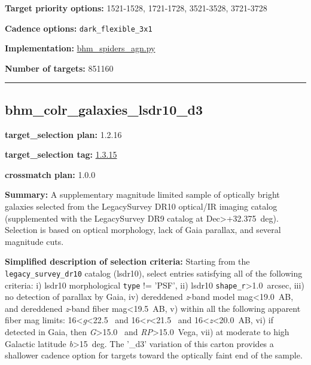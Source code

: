 \noindent\textbf{Target priority options:} 1521-1528, 1721-1728, 3521-3528,
3721-3728

\noindent\textbf{Cadence options:} \texttt{dark\_flexible\_3x1}

\noindent\textbf{Implementation:}
\href{https://github.com/sdss/target_selection/blob/1.3.3/python/target_selection/cartons/bhm_spiders_agn.py}{bhm\_spiders\_agn.py}

\noindent\textbf{Number of targets:} 851160

\begin{center}\rule{0.5\linewidth}{0.5pt}\end{center}

\hypertarget{bhm_colr_galaxies_lsdr10_d3_plan1.2.16}{%
\subsection{bhm\_colr\_galaxies\_lsdr10\_d3}\label{bhm_colr_galaxies_lsdr10_d3_plan1.2.16}}

\noindent\textbf{target\_selection plan:} 1.2.16

\noindent\textbf{target\_selection tag:}
\href{https://github.com/sdss/target_selection/tree/1.3.15/}{1.3.15}

\noindent\textbf{crossmatch plan:} 1.0.0

\noindent\textbf{Summary:} A supplementary magnitude limited sample of optically
bright galaxies selected from the LegacySurvey DR10 optical/IR imaging
catalog (supplemented with the LegacySurvey DR9 catalog at
Dec\textgreater+32.375~deg). Selection is based on optical morphology,
lack of Gaia parallax, and several magnitude cuts.

\noindent\textbf{Simplified description of selection criteria:} Starting from the
\texttt{legacy\_survey\_dr10} catalog (lsdr10), select entries
satisfying all of the following criteria: i) lsdr10 morphological
\texttt{type} != 'PSF', ii) lsdr10
\texttt{shape\_r}\textgreater1.0~arcsec, iii) no detection of parallax
by Gaia, iv) dereddened \emph{z}-band model mag\textless19.0~AB, and
dereddened \emph{z}-band fiber mag\textless19.5~AB, v) within all the
following apparent fiber mag limits: 16\textless{}\emph{g}\textless22.5~
and 16\textless{}\emph{r}\textless21.5~ and
16\textless{}\emph{z}\textless20.0~AB, vi) if detected in Gaia, then
\emph{G}\textgreater15.0~ and \emph{RP}\textgreater15.0~Vega, vii) at
moderate to high Galactic latitude
\textbar{}\emph{b}\textbar\textgreater15~deg. The '\_d3' variation of
this carton provides a shallower cadence option for targets toward the
optically faint end of the sample.


